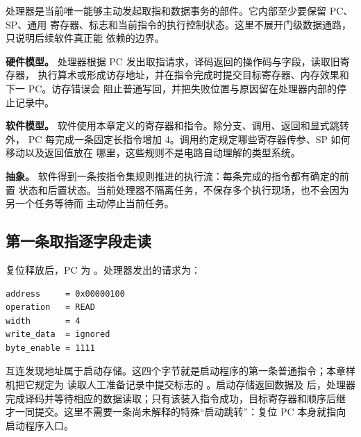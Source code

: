 处理器是当前唯一能够主动发起取指和数据事务的部件。它内部至少要保留 PC、SP、通用
寄存器、标志和当前指令的执行控制状态。这里不展开门级数据通路，只说明后续软件真正能
依赖的边界。

\textbf{硬件模型。} 处理器根据 PC 发出取指请求，译码返回的操作码与字段，读取旧寄存器，
执行算术或形成访存地址，并在指令完成时提交目标寄存器、内存效果和下一 PC。访存错误会
阻止普通写回，并把失败位置与原因留在处理器内部的停止记录中。

\textbf{软件模型。} 软件使用本章定义的寄存器和指令。除分支、调用、返回和显式跳转外，
PC 每完成一条固定长指令增加 4。调用约定规定哪些寄存器传参、SP 如何移动以及返回值放在
哪里，这些规则不是电路自动理解的类型系统。

\textbf{抽象。} 软件得到一条按指令集规则推进的执行流：每条完成的指令都有确定的前置
状态和后置状态。当前处理器不隔离任务，不保存多个执行现场，也不会因为另一个任务等待而
主动停止当前任务。

\subsection{第一条取指逐字段走读}

复位释放后，PC 为 。处理器发出的请求为：

\begin{lstlisting}
address     = 0x00000100
operation   = READ
width       = 4
write_data  = ignored
byte_enable = 1111
\end{lstlisting}

互连发现地址属于启动存储。这四个字节就是启动程序的第一条普通指令；本章样机把它规定为
读取人工准备记录中提交标志的 。启动存储返回数据及  后，处理器
完成译码并等待相应的数据读取；只有该装入指令成功，目标寄存器和顺序后继
 才一同提交。这里不需要一条尚未解释的特殊“启动跳转”：复位 PC
本身就指向启动程序入口。

\begin{center}
\end{center}

